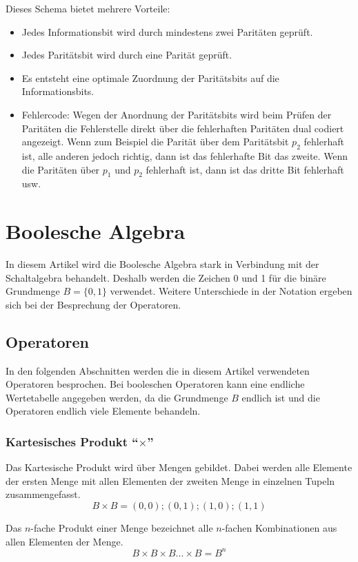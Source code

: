 Dieses Schema bietet mehrere Vorteile:
\begin{itemize}
\item
	Jedes Informationsbit wird durch mindestens zwei Paritäten geprüft.
\item
	Jedes Paritätsbit wird durch eine Parität geprüft.
\item
	Es entsteht eine optimale Zuordnung der Paritätsbits auf die Informationsbits.
\item
	Fehlercode: Wegen der Anordnung der Paritätsbits wird beim Prüfen der Paritäten die Fehlerstelle direkt über die fehlerhaften Paritäten dual codiert angezeigt. Wenn zum Beispiel die Parität über dem Paritätsbit $p_2$ fehlerhaft ist, alle anderen jedoch richtig, dann ist das fehlerhafte Bit das zweite. Wenn die Paritäten über $p_1$ und $p_2$ fehlerhaft ist, dann ist das dritte Bit fehlerhaft usw.
\end{itemize}

\chapter{Boolesche Algebra}
In diesem Artikel wird die Boolesche Algebra stark in Verbindung mit der Schaltalgebra behandelt. Deshalb werden die Zeichen 0 und 1 für die binäre Grundmenge $B = \{0,1\}$ verwendet. Weitere Unterschiede in der Notation ergeben sich bei der Besprechung der Operatoren.

\section{Operatoren}
In den folgenden Abschnitten werden die in diesem Artikel verwendeten Operatoren besprochen. Bei booleschen Operatoren kann eine endliche Wertetabelle angegeben werden, da die Grundmenge $B$ endlich ist und die Operatoren endlich viele Elemente behandeln.

\subsection{Kartesisches Produkt "`$\times$"'}
Das Kartesische Produkt wird über Mengen gebildet. Dabei werden alle Elemente der ersten Menge mit allen Elementen der zweiten Menge in einzelnen Tupeln zusammengefasst.
$$ B \times B = (0,0); (0,1); (1,0); (1,1)$$

Das $n$-fache Produkt einer Menge bezeichnet alle $n$-fachen Kombinationen aus allen Elementen der Menge.
$$ B \times B  \times B ...  \times B = B^n$$

